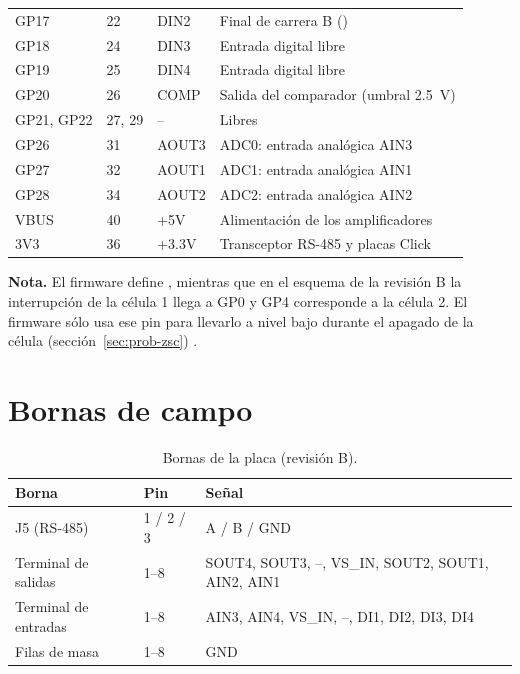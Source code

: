 \begin{longtable}{@{}lllL{0.44\textwidth}@{}}
GP17 & 22 & DIN2    & Final de carrera B () \\
GP18 & 24 & DIN3    & Entrada digital libre \\
GP19 & 25 & DIN4    & Entrada digital libre \\
GP20 & 26 & COMP    & Salida del comparador (umbral \SI{2.5}{\volt}) \\
GP21, GP22 & 27, 29 & -- & Libres \\
GP26 & 31 & AOUT3   & ADC0: entrada analógica AIN3 \\
GP27 & 32 & AOUT1   & ADC1: entrada analógica AIN1 \\
GP28 & 34 & AOUT2   & ADC2: entrada analógica AIN2 \\
VBUS & 40 & +5V     & Alimentación de los amplificadores \\
3V3  & 36 & +3.3V   & Transceptor RS-485 y placas Click \\
\bottomrule
\end{longtable}

\noindent\textbf{Nota.} El firmware define , mientras que en el esquema de
la revisión B la interrupción de la célula 1 llega a GP0 y GP4 corresponde a la célula 2. El firmware
sólo usa ese pin para llevarlo a nivel bajo durante el apagado de la célula
(sección~\ref{sec:prob-zsc}) .

\section{Bornas de campo}

\begin{table}[H]
\centering
\caption{Bornas de la placa (revisión B).}
\label{tab:bornas}
\begin{tabular}{@{}lll@{}}
\toprule
Borna & Pin & Señal \\
\midrule
J5 (RS-485) & 1 / 2 / 3 & A / B / GND \\
Terminal de salidas & 1--8 & SOUT4, SOUT3, --, VS\_IN, SOUT2, SOUT1, AIN2, AIN1 \\
Terminal de entradas & 1--8 & AIN3, AIN4, VS\_IN, --, DI1, DI2, DI3, DI4 \\
Filas de masa & 1--8 & GND \\
\bottomrule
\end{tabular}
\end{table}

